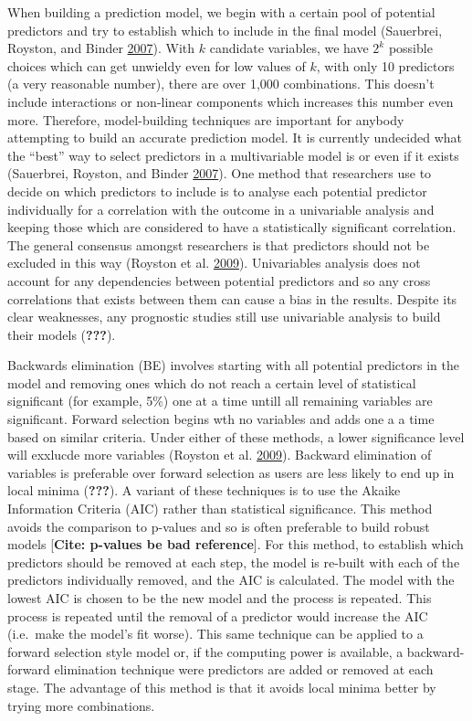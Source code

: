 \documentclass[
]{article}
\begin{document}
When building a prediction model, we begin with a certain pool of potential predictors and try to establish which to include in the final model (Sauerbrei, Royston, and Binder \protect\hyperlink{ref-sauerbrei_selection_2007}{2007}). With \(k\) candidate variables, we have \(2^k\) possible choices which can get unwieldy even for low values of \(k\), with only 10 predictors (a very reasonable number), there are over 1,000 combinations. This doesn't include interactions or non-linear components which increases this number even more. Therefore, model-building techniques are important for anybody attempting to build an accurate prediction model. It is currently undecided what the ``best'' way to select predictors in a multivariable model is or even if it exists (Sauerbrei, Royston, and Binder \protect\hyperlink{ref-sauerbrei_selection_2007}{2007}). One method that researchers use to decide on which predictors to include is to analyse each potential predictor individually for a correlation with the outcome in a univariable analysis and keeping those which are considered to have a statistically significant correlation. The general consensus amongst researchers is that predictors should not be excluded in this way (Royston et al. \protect\hyperlink{ref-royston_prognosis_2009}{2009}). Univariables analysis does not account for any dependencies between potential predictors and so any cross correlations that exists between them can cause a bias in the results. Despite its clear weaknesses, any prognostic studies still use univariable analysis to build their models ({\textbf{???}}).

Backwards elimination (BE) involves starting with all potential predictors in the model and removing ones which do not reach a certain level of statistical significant (for example, 5\%) one at a time untill all remaining variables are significant. Forward selection begins wth no variables and adds one a a time based on similar criteria. Under either of these methods, a lower significance level will exxlucde more variables (Royston et al. \protect\hyperlink{ref-royston_prognosis_2009}{2009}). Backward elimination of variables is preferable over forward selection as users are less likely to end up in local minima ({\textbf{???}}). A variant of these techniques is to use the Akaike Information Criteria (AIC) rather than statistical significance. This method avoids the comparison to p-values and so is often preferable to build robust models {[}\textbf{Cite: p-values be bad reference}{]}. For this method, to establish which predictors should be removed at each step, the model is re-built with each of the predictors individually removed, and the AIC is calculated. The model with the lowest AIC is chosen to be the new model and the process is repeated. This process is repeated until the removal of a predictor would increase the AIC (i.e.~make the model's fit worse). This same technique can be applied to a forward selection style model or, if the computing power is available, a backward-forward elimination technique were predictors are added or removed at each stage. The advantage of this method is that it avoids local minima better by trying more combinations.
\end{document}
